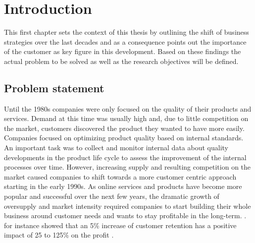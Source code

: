 \chapter{Introduction}
\label{ch:intro}
This first chapter sets the context of this thesis by outlining the shift of business strategies over the last decades and as a consequence points out the importance of the customer as key figure in this development. Based on these findings the actual problem to be solved as well as the research objectives will be defined. 

\section{Problem statement}
\label{sec:problem}
Until the 1980s companies were only focused on the quality of their products and services. Demand at this time was usually high and, due to little competition on the market, customers discovered the product they wanted to have more easily. Companies focused on optimizing product quality based on internal standards. An important task was to collect and monitor internal data about quality developments in the product life cycle to assess the improvement of the internal processes over time. However, increasing supply and resulting competition on the market caused companies to shift towards a more customer centric approach starting in the early 1990s. As online services and products have become more popular and successful over the next few years, the dramatic growth of oversupply and market intensity required companies to start building their whole business around customer needs and wants to stay profitable in the long-term. \cite{neckel2015}. \cite{bowen2001relationship} for instance showed that an 5\% increase of customer retention has a positive impact of 25 to 125\% on the profit .

